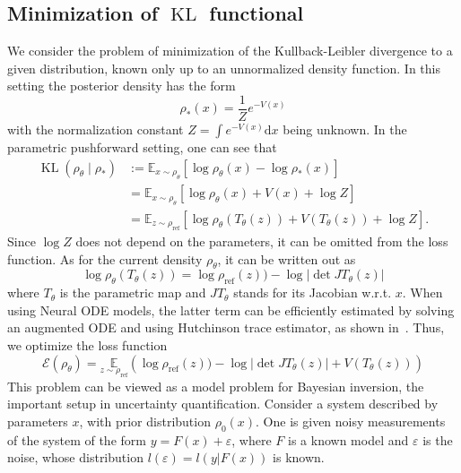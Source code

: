 \documentclass{article} %
\numberwithin{equation}{subsection}
\numberwithin{theorem}{section}
\newcommand{\dd}{\mathrm{d}}
\newcommand{\cE}{\mathcal{E}}
\newcommand{\rhoref}{{\rho_{\text{ref}}}}
\begin{document}
    \subsection{Minimization of $\operatorname{KL}$ functional} \label{ss:app_KL}
    We consider the problem of minimization of the Kullback-Leibler divergence to a given distribution, known only up to an unnormalized density function. 
    In this setting the posterior density has the form
    \begin{equation*}
        \rho_*(x) = \frac{1}{Z}e^{-V(x)}
    \end{equation*}
    with the normalization constant $Z = \int e^{-V(x)}\dd x$ being unknown.
    In the parametric pushforward setting, one can see that
\begin{align*}
    \operatorname{KL}(\rho_\theta \mid \rho_*)
    &:=
    \mathbb{E}_{x \sim \rho_\theta}
    \left[
        \log \rho_\theta(x) - \log \rho_*(x)
    \right]
    \\
    &=
    \mathbb{E}_{x \sim \rho_\theta}
    \left[
        \log \rho_\theta(x) + V(x) + \log Z
    \right]
    \\
    &=
    \mathbb{E}_{z \sim \rhoref}
    \left[
        \log \rho_\theta(T_\theta(z))
        +
        V(T_\theta(z))
        +
        \log Z
    \right].
\end{align*}
    Since $\log Z$ does not depend on the parameters, it can be omitted from the loss function.
    As for the current density $\rho_\theta$, it can be written out as
    \begin{equation*}
        \log\rho_\theta(T_\theta(z)) = \log\rhoref(z)) - \log|\operatorname{det}J T_\theta(z)|
    \end{equation*}
    where $T_\theta$ is the parametric map and $JT_\theta$ stands for its Jacobian w.r.t. $x$.
    When using Neural ODE models, the latter term can be efficiently estimated by solving an augmented ODE and using Hutchinson trace estimator, as shown in~\cite{grathwohl2018ffjord}.
    Thus, we optimize the loss function
    \begin{equation}\label{eq:app_KL_loss}
        \cE(\rho_\theta) =  \underset{z \sim \rhoref}{\mathbb{E}}\left( \log\rhoref(z)) - \log|\operatorname{det}J T_\theta(z)| + V(T_\theta(z))\right)
    \end{equation}
    This problem can be viewed as a model problem for Bayesian inversion, the important setup in uncertainty quantification.
    Consider a system described by parameters $x$, with prior distribution $\rho_0(x)$.
    One is given noisy measurements of the system of the form $y = F(x) + \varepsilon$, where $F$ is a known model and $\varepsilon$ is the noise, whose distribution $l(\varepsilon) = l(y|F(x))$ is known.
\end{document}
